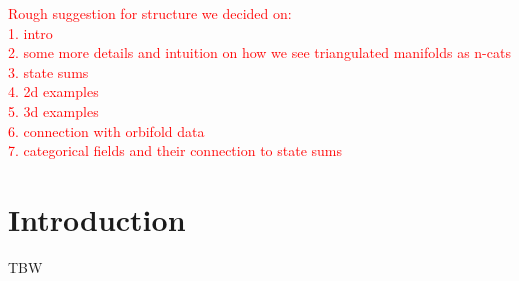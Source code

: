 
\textcolor{red}{Rough suggestion for structure we decided on:
\\
1. intro
\\
2. some more details and intuition on how we see triangulated manifolds as n-cats
\\
3. state sums
\\
4. 2d examples
\\
5. 3d examples
\\
6. connection with orbifold data
\\
7. categorical fields and their connection to state sums
}


\section{Introduction} \label{s:introduction}

\noindent TBW